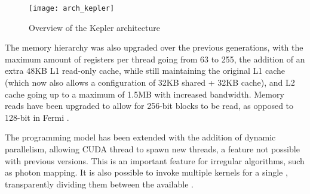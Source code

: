 \documentclass[main.tex]{subfiles}
\begin{document}
\begin{figure}
  \centering
  \texttt{[image: arch\_kepler]}
  \caption{Overview of the Kepler architecture \label{fig:kepler}}
\end{figure}

The memory hierarchy was also upgraded over the previous generations, with the maximum amount of registers per thread going from 63 to 255, the addition of an extra 48KB L1 read-only cache, while still maintaining the original L1 cache (which now also allows a configuration of 32KB shared + 32KB cache), and L2 cache going up to a maximum of 1.5MB with increased bandwidth. Memory reads have been upgraded to allow for 256-bit blocks to be read, as opposed to 128-bit in Fermi \cite{NVIDIA:kepler}.

The programming model has been extended with the addition of dynamic parallelism, allowing \acs{CUDA} thread to spawn new threads, a feature not possible with previous versions. This is an important feature for irregular algorithms, such as photon mapping. It is also possible to invoke multiple kernels for a single \gpu, transparently dividing them between the available \smxs.
\end{document}
